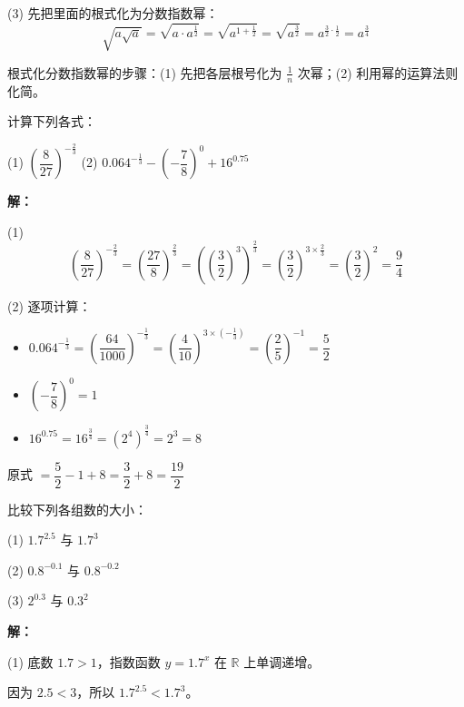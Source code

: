 \documentclass[12pt, a4paper]{ctexart}
\begin{document}
(3) 先把里面的根式化为分数指数幂：
\[
\sqrt{a\sqrt{a}} = \sqrt{a \cdot a^{\frac{1}{2}}} = \sqrt{a^{1+\frac{1}{2}}} = \sqrt{a^{\frac{3}{2}}} = a^{\frac{3}{2}\cdot\frac{1}{2}} = a^{\frac{3}{4}}
\]

\begin{tipbox}[方法总结]
根式化分数指数幂的步骤：(1) 先把各层根号化为 $\frac{1}{n}$ 次幂；(2) 利用幂的运算法则化简。
\end{tipbox}

\begin{examplebox}[【例2】指数幂的化简计算]
计算下列各式：
\par (1) $\left(\dfrac{8}{27}\right)^{-\frac{2}{3}}$ \qquad (2) $0.064^{-\frac{1}{3}} - \left(-\dfrac{7}{8}\right)^{0} + 16^{0.75}$
\end{examplebox}

\textbf{解：}

(1)
\[
\left(\frac{8}{27}\right)^{-\frac{2}{3}} = \left(\frac{27}{8}\right)^{\frac{2}{3}} = \left(\left(\frac{3}{2}\right)^3\right)^{\frac{2}{3}} = \left(\frac{3}{2}\right)^{3 \times \frac{2}{3}} = \left(\frac{3}{2}\right)^{2} = \frac{9}{4}
\]

(2) 逐项计算：
\begin{itemize}[leftmargin=2em]
  \item $0.064^{-\frac{1}{3}} = \left(\dfrac{64}{1000}\right)^{-\frac{1}{3}} = \left(\dfrac{4}{10}\right)^{3 \times (-\frac{1}{3})} = \left(\dfrac{2}{5}\right)^{-1} = \dfrac{5}{2}$
  \item $\left(-\dfrac{7}{8}\right)^0 = 1$
  \item $16^{0.75} = 16^{\frac{3}{4}} = (2^4)^{\frac{3}{4}} = 2^3 = 8$
\end{itemize}

原式 $= \dfrac{5}{2} - 1 + 8 = \dfrac{3}{2} + 8 = \dfrac{19}{2}$

\begin{examplebox}[【例3】判断指数函数的单调性]
比较下列各组数的大小：
\par (1) $1.7^{2.5}$ 与 $1.7^{3}$
\par (2) $0.8^{-0.1}$ 与 $0.8^{-0.2}$
\par (3) $2^{0.3}$ 与 $0.3^{2}$
\end{examplebox}

\textbf{解：}

(1) 底数 $1.7>1$，指数函数 $y=1.7^x$ 在 $\mathbb{R}$ 上单调递增。

因为 $2.5 < 3$，所以 $1.7^{2.5} < 1.7^{3}$。
\end{document}
